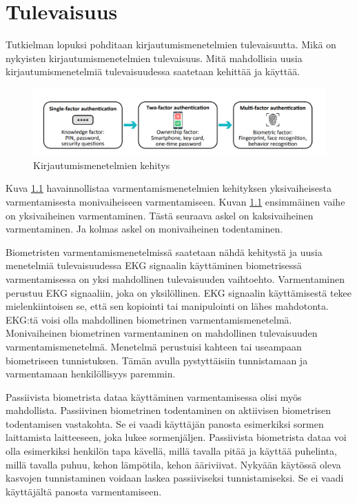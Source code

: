 \chapter{Tulevaisuus\label{tulevaisuus}}

Tutkielman lopuksi pohditaan kirjautumismenetelmien tulevaisuutta. Mikä on nykyisten kirjautumismenetelmien tulevaisuus. Mitä mahdollisia uusia kirjautumismenetelmiä tulevaisuudessa saatetaan kehittää ja käyttää.

\begin{figure}[ht]
    \centering
    \includegraphics[width=12cm]{template/figures/Evolution-of-authentication-methods.PNG}
    \caption{Kirjautumismenetelmien kehitys \citep{cryptography2010001}}
    \label{fig:authentication-evolution}
\end{figure}

Kuva \ref{fig:authentication-evolution} havainnollistaa varmentamismenetelmien kehityksen yksivaiheisesta varmentamisesta monivaiheiseen varmentamiseen. Kuvan \ref{fig:authentication-evolution} ensimmäinen vaihe on yksivaiheinen varmentaminen. Tästä seuraava askel on kaksivaiheinen varmentaminen. Ja kolmas askel on monivaiheinen todentaminen. 

Biometristen varmentamismenetelmissä saatetaan nähdä kehitystä ja uusia menetelmiä tulevaisuudessa
EKG signaalin käyttäminen biometrisessä varmentamisessa on yksi mahdollinen tulevaisuuden vaihtoehto. Varmentaminen perustuu EKG signaaliin, joka on yksilöllinen. EKG signaalin käyttämisestä tekee mielenkiintoisen se, että sen kopiointi tai manipulointi on lähes mahdotonta. EKG:tä voisi olla mahdollinen biometrinen varmentamismenetelmä. \citep{shdefat2018utilizing}
Monivaiheinen biometrinen varmentaminen on mahdollinen tulevaisuuden varmentamismenetelmä. Menetelmä perustuisi kahteen tai useampaan biometriseen tunnistuksen. Tämän avulla pystyttäisiin tunnistamaan ja varmentamaan henkilöllisyys paremmin. \citep{biometric_authentication_systems}

Passiivista biometrista dataa käyttäminen varmentamisessa olisi myös mahdollista. Passiivinen biometrinen todentaminen on aktiivisen biometrisen todentamisen vastakohta. Se ei vaadi käyttäjän panosta esimerkiksi sormen laittamista laitteeseen, joka lukee sormenjäljen. Passiivista biometrista dataa voi olla esimerkiksi henkilön tapa kävellä, millä tavalla pitää ja käyttää puhelinta, millä tavalla puhuu, kehon lämpötila, kehon ääriviivat. Nykyään käytössä oleva kasvojen tunnistaminen voidaan laskea passiiviseksi tunnistamiseksi. Se ei vaadi käyttäjältä panosta varmentamiseen. \citep{biometric_authentication_systems}\citep{passive_biometrics}

